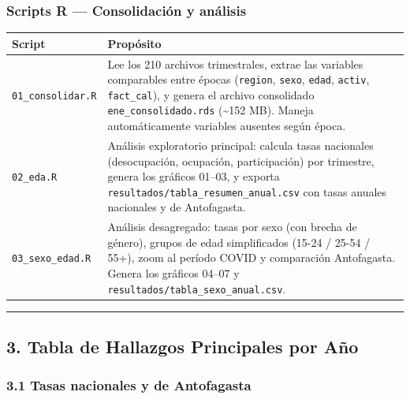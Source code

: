 \documentclass[
]{article}
\newcounter{none} %
\begin{document}
\subsubsection{Scripts R --- Consolidación y
análisis}\label{scripts-r-consolidaciuxf3n-y-anuxe1lisis}

{\def\LTcaptype{none} %
\begin{longtable}[]{@{}
  >{\raggedright\arraybackslash}p{}
  >{\raggedright\arraybackslash}p{}@{}}
\toprule\noalign{}
\begin{minipage}[b]{\linewidth}\raggedright
Script
\end{minipage} & \begin{minipage}[b]{\linewidth}\raggedright
Propósito
\end{minipage} \\
\midrule\noalign{}
\endhead
\bottomrule\noalign{}
\endlastfoot
\texttt{01\_consolidar.R} & Lee los 210 archivos trimestrales, extrae
las variables comparables entre épocas (\texttt{region}, \texttt{sexo},
\texttt{edad}, \texttt{activ}, \texttt{fact\_cal}), y genera el archivo
consolidado \texttt{ene\_consolidado.rds} (\textasciitilde152 MB).
Maneja automáticamente variables ausentes según época. \\
\texttt{02\_eda.R} & Análisis exploratorio principal: calcula tasas
nacionales (desocupación, ocupación, participación) por trimestre,
genera los gráficos 01--03, y exporta
\texttt{resultados/tabla\_resumen\_anual.csv} con tasas anuales
nacionales y de Antofagasta. \\
\texttt{03\_sexo\_edad.R} & Análisis desagregado: tasas por sexo (con
brecha de género), grupos de edad simplificados (15-24 / 25-54 / 55+),
zoom al período COVID y comparación Antofagasta. Genera los gráficos
04--07 y \texttt{resultados/tabla\_sexo\_anual.csv}. \\
\end{longtable}
}

\begin{center}\rule{0.5\linewidth}{0.5pt}\end{center}

\subsection{3. Tabla de Hallazgos Principales por
Año}\label{tabla-de-hallazgos-principales-por-auxf1o}

\subsubsection{3.1 Tasas nacionales y de
Antofagasta}\label{tasas-nacionales-y-de-antofagasta}
\end{document}
